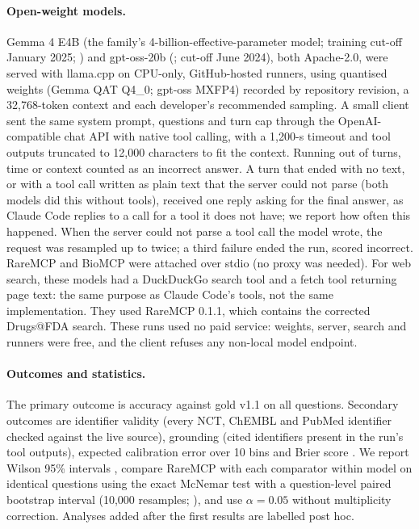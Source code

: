 \documentclass[11pt]{article}
\begin{document}
\paragraph{Open-weight models.} Gemma 4 E4B (the family's 4-billion-effective-parameter model; training cut-off January 2025; \citealp{gemma4}) and gpt-oss-20b (\citealp{gptoss}; cut-off June 2024), both Apache-2.0, were served with llama.cpp \citep{llamacpp} on CPU-only, GitHub-hosted runners, using quantised weights (Gemma QAT Q4\_0; gpt-oss MXFP4) recorded by repository revision, a 32,768-token context and each developer's recommended sampling. A small client sent the same system prompt, questions and turn cap through the OpenAI-compatible chat API with native tool calling, with a 1,200-s timeout and tool outputs truncated to 12,000 characters to fit the context. Running out of turns, time or context counted as an incorrect answer. A turn that ended with no text, or with a tool call written as plain text that the server could not parse (both models did this without tools), received one reply asking for the final answer, as Claude Code replies to a call for a tool it does not have; we report how often this happened. When the server could not parse a tool call the model wrote, the request was resampled up to twice; a third failure ended the run, scored incorrect. RareMCP and BioMCP were attached over stdio (no proxy was needed). For web search, these models had a DuckDuckGo search tool and a fetch tool returning page text: the same purpose as Claude Code's tools, not the same implementation. They used RareMCP 0.1.1, which contains the corrected Drugs@FDA search. These runs used no paid service: weights, server, search and runners were free, and the client refuses any non-local model endpoint.

\paragraph{Outcomes and statistics.} The primary outcome is accuracy against gold v1.1 on all questions. Secondary outcomes are identifier validity (every NCT, ChEMBL and PubMed identifier checked against the live source), grounding (cited identifiers present in the run's tool outputs), expected calibration error over 10 bins \citep{guo2017} and Brier score \citep{brier1950}. We report Wilson 95\% intervals \citep{wilson1927}, compare RareMCP with each comparator within model on identical questions using the exact McNemar test \citep{mcnemar1947} with a question-level paired bootstrap interval (10,000 resamples; \citealp{efron1993}), and use $\alpha=0.05$ without multiplicity correction. Analyses added after the first results are labelled post hoc.
\end{document}
